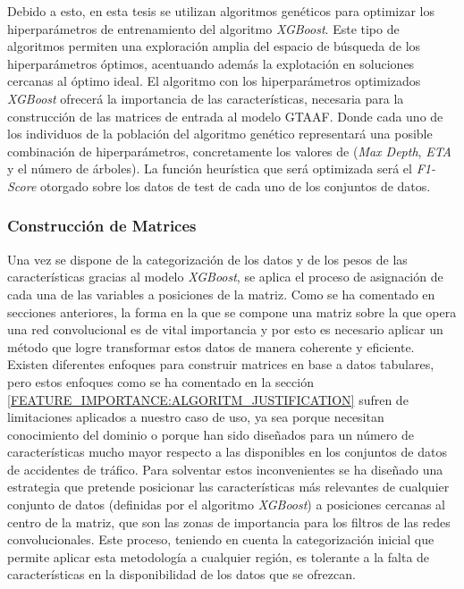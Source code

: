 Debido a esto, en esta tesis se utilizan algoritmos genéticos para optimizar los hiperparámetros de entrenamiento del algoritmo \textit{XGBoost}. Este tipo de algoritmos permiten una exploración amplia del espacio de búsqueda de los hiperparámetros óptimos, acentuando además la explotación en soluciones cercanas al óptimo ideal. El algoritmo con los hiperparámetros optimizados \textit{XGBoost} ofrecerá la importancia de las características, necesaria para la construcción de las matrices de entrada al modelo GTAAF. Donde cada uno de los individuos de la población del algoritmo genético representará una posible combinación de hiperparámetros, concretamente los valores de (\textit{Max Depth}, \textit{ETA} y el número de árboles). La función heurística que será optimizada será el \textit{F1-Score} otorgado sobre los datos de test de cada uno de los conjuntos de datos.

\subsubsection{Construcción de Matrices}

Una vez se dispone de la categorización de los datos y de los pesos de las características gracias al modelo \textit{XGBoost}, se aplica el proceso de asignación de cada una de las variables a posiciones de la matriz. Como se ha comentado en secciones anteriores, la forma en la que se compone una matriz sobre la que opera una red convolucional es de vital importancia y por esto es necesario aplicar un método que logre transformar estos datos de manera coherente y eficiente. Existen diferentes enfoques para construir matrices en base a datos tabulares, pero estos enfoques como se ha comentado en la sección \ref{FEATURE_IMPORTANCE:ALGORITM_JUSTIFICATION} sufren de limitaciones aplicados a nuestro caso de uso, ya sea porque necesitan conocimiento del dominio o porque han sido diseñados para un número de características mucho mayor respecto a las disponibles en los conjuntos de datos de accidentes de tráfico. Para solventar estos inconvenientes se ha diseñado una estrategia que pretende posicionar las características más relevantes de cualquier conjunto de datos (definidas por el algoritmo \textit{XGBoost}) a posiciones cercanas al centro de la matriz, que son las zonas de importancia para los filtros de las redes convolucionales. Este proceso, teniendo en cuenta la categorización inicial que permite aplicar esta metodología a cualquier región, es tolerante a la falta de características en la disponibilidad de los datos que se ofrezcan.

